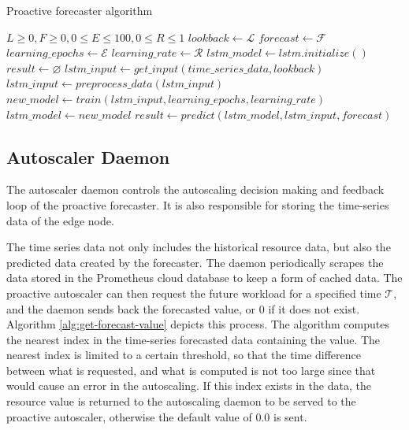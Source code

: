 \begin{algorithm}
    \caption{Proactive forecaster algorithm}
    \label{alg:proactive-forecast-alg}
    \begin{algorithmic}
        \Require $L \geq 0, F \geq 0, 0 \leq E \leq 100, 0 \leq R \leq 1$
        \State $lookback \gets \mathcal{L}$
        \State $forecast \gets \mathcal{F}$
        \State $learning\_epochs \gets \mathcal{E}$
        \State $learning\_rate \gets \mathcal{R}$
        \State $lstm\_model \gets lstm.initialize()$
        \State $result \gets \varnothing$
            \State $lstm\_input \gets get\_input(time\_series\_data, lookback)$
            \State $lstm\_input \gets preprocess\_data(lstm\_input)$
            \State $new\_model \gets train(lstm\_input, learning\_epochs, learning\_rate)$
                \State $lstm\_model \gets new\_model$
            \EndIf
            \State $result \gets predict(lstm\_model, lstm\_input, forecast)$
        \EndWhile
    \end{algorithmic}
\end{algorithm}

\subsection{Autoscaler Daemon}
\label{subsec:auto-daemon-subsection}

The autoscaler daemon controls the autoscaling decision making and feedback loop of the proactive forecaster. It is also responsible for storing the time-series data of the edge node.\par

The time series data not only includes the historical resource data, but also the predicted data created by the forecaster. The daemon periodically scrapes the data stored in the Prometheus cloud database to keep a form of cached data. The proactive autoscaler can then request the future workload for a specified time $\mathcal{T}$, and the daemon sends back the forecasted value, or $0$ if it does not exist. Algorithm \ref{alg:get-forecast-value} depicts this process. The algorithm computes the nearest index in the time-series forecasted data containing the value. The nearest index is limited to a certain threshold, so that the time difference between what is requested, and what is computed is not too large since that would cause an error in the autoscaling. If this index exists in the data, the resource value is returned to the autoscaling daemon to be served to the proactive autoscaler, otherwise the default value of $0.0$ is sent.

